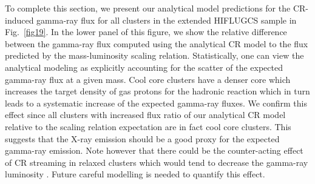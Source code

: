 \documentclass[10pt,aps,pra,reprint,amsmath,amsfonts,amssymb,showpacs,nofootinbib,floatfix]{revtex4-1}
\begin{document}
To complete this section, we present our analytical model predictions
for the CR-induced gamma-ray flux for all clusters in the extended
HIFLUGCS sample in Fig.~\ref{fig19}. In the lower panel of this
figure, we show the relative difference between the gamma-ray flux
computed using the analytical CR model to the flux predicted by the
mass-luminosity scaling relation. Statistically, one can view the
analytical modeling as explicitly accounting for the scatter of the expected
gamma-ray flux at a given mass. Cool core clusters have a denser core
which increases the target density of gas protons for the hadronic
reaction which in turn leads to a systematic increase of the expected
gamma-ray fluxes. We confirm this effect since all clusters with
increased flux ratio of our analytical CR model relative to the scaling relation
expectation are in fact cool core clusters. This suggests that the X-ray
emission should be a good proxy for the expected gamma-ray
emission. Note however that there could be the counter-acting effect
of CR streaming in relaxed clusters which would tend to decrease the
gamma-ray luminosity \cite{2011A&A...527A..99E}. Future careful
modelling is needed to quantify this effect.
\end{document}
